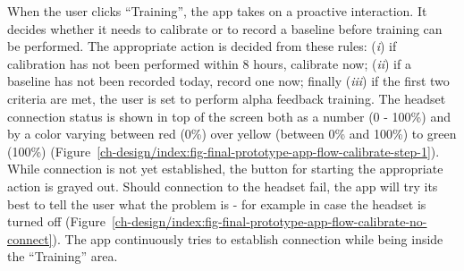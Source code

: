 \documentclass[a4paper,10pt,english,lof,lot,twoside]{puthesis}
\begin{document}
When the user clicks ``Training'', the app takes on a proactive interaction. It
decides whether it needs to calibrate or to record a baseline before training
can be performed. The appropriate action is decided from these rules: (\emph{i}) if
calibration has not been performed within 8 hours, calibrate now; (\emph{ii}) if a
baseline has not been recorded today, record one now; finally (\emph{iii}) if the first two
criteria are met, the user is set to perform alpha feedback training.  The
headset connection status is shown in top of the screen both as a number (0 -
100\%) and by a color varying between red (0\%) over yellow (between 0\% and 100\%)
to green (100\%) (Figure \ref{ch-design/index:fig-final-prototype-app-flow-calibrate-step-1}). While connection is not
yet established, the button for starting the appropriate action is grayed
out. Should connection to the headset fail, the app will try its best to tell
the user what the problem is - for example in case the headset is turned off
(Figure \ref{ch-design/index:fig-final-prototype-app-flow-calibrate-no-connect}). The
app continuously tries to establish connection while being inside the ``Training''
area.
\end{document}
